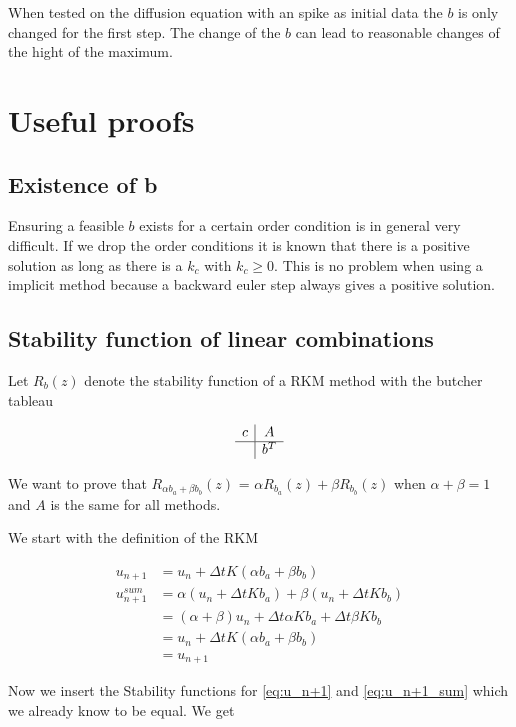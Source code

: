 \documentclass{article}
\begin{document}
When tested on the diffusion equation with an spike as initial data the $b$ is only changed for the first step. The change of the $b$ can lead to reasonable changes of the hight of the maximum. 



\section{Useful proofs}

\subsection{Existence of b}
Ensuring a feasible $b$ exists for a certain order condition is in general very difficult.
If we drop the order conditions it is known that there is a positive solution as long as there is a $k_c$ with $k_c \geq 0$.
This is no problem when using a implicit method because a backward euler step always gives a positive solution. 

\subsection{Stability function of linear combinations}\label{proof:combiningb}
Let $R_b(z)$ denote the stability function of a RKM method with the butcher tableau

$$
\begin{array}
{c|c}
c & A\\
\hline
& b^T
\end{array}
$$

We want to prove that $R_{\alpha b_a+\beta b_b}(z)$ = $\alpha R_{ b_a}(z)+\beta R_{b_b}(z)$ when $\alpha + \beta = 1$ and $A$ is the same for all methods.

We start with the definition of the RKM

\begin{align}
u_{n+1} &= u_n + \Delta t K (\alpha b_a+\beta b_b) \label{eq:u_n+1}  \\
u_{n+1}^{sum} &= \alpha (u_n + \Delta t K b_a) + \beta (u_n + \Delta t K b_b) \label{eq:u_n+1_sum} \\
& = (\alpha + \beta) u_n + \Delta t \alpha K b_a + \Delta t \beta K b_b \\
&= u_n + \Delta t K (\alpha b_a+\beta b_b) \\
&=u_{n+1} 
\end{align}

Now we insert the Stability functions for \ref{eq:u_n+1} and \ref{eq:u_n+1_sum} which we already know to be equal. We get 
\end{document}
